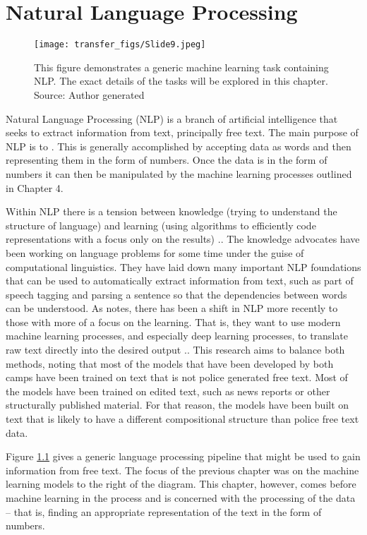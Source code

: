 \chapter{Natural Language Processing}

\begin{figure}
  \texttt{[image: transfer\_figs/Slide9.jpeg]}
  \caption[NLP process Overview.]{This figure demonstrates a generic machine learning task containing NLP. The exact details of the tasks will be explored in this chapter. Source: Author generated}
  \label{fig:overview}
\end{figure}

Natural Language Processing (NLP) is a branch of artificial intelligence that seeks to extract information from text, principally free text. The main purpose of NLP is to  \parencite{eisenstein2018natural}. This is generally accomplished by accepting data as words and then representing them in the form of numbers. Once the data is in the form of numbers it can then be manipulated by the machine learning processes outlined in Chapter 4.


Within NLP there is a tension between knowledge (trying to understand the structure of language) and learning (using algorithms to efficiently code representations with a focus only on the results) \parencite{eisenstein2018natural}.. The knowledge advocates have been working on language problems for some time under the guise of computational linguistics. They have laid down many important NLP foundations that can be used to automatically extract information from text, such as part of speech tagging and parsing a sentence so that the dependencies between words can be understood. As \textcite{manning2015computational} notes, there has been a shift in NLP more recently to those with more of a focus on the learning. That is, they want to use modern machine learning processes, and especially deep learning processes, to translate raw text directly into the desired output \parencite{eisenstein2018natural}.. This research aims to balance both methods, noting that most of the models that have been developed by both camps have been trained on text that is not police generated free text. Most of the models have been trained on edited text, such as news reports or other structurally published material. For that reason, the models have been built on text that is likely to have a different compositional structure than police free text data.


Figure \ref{fig:overview} gives a generic language processing pipeline that might be used to gain information from free text. The focus of the previous chapter was on the machine learning models to the right of the diagram. This chapter, however, comes before machine learning in the process and is concerned with the processing of the data – that is, finding an appropriate representation of the text in the form of numbers.

